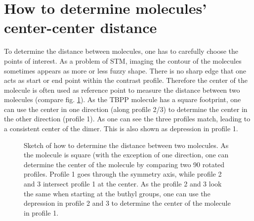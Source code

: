 \label{appendix:TBP}
\section{How to determine molecules' center-center distance}
To determine the distance between molecules, one has to carefully choose the points of interest. As a problem of STM, imaging the contour of the molecules sometimes appears as more or less fuzzy shape. There is no sharp edge that one acts as start or end point within the contrast profile. Therefore the center of the molecule is often used as reference point to measure the distance between two molecules (compare fig. \ref{fig:distance-molecules}). As the TBPP molecule has a square footprint, one can use the center in one direction (along profile 2/3) to determine the center in the other direction (profile 1). As one can see the three profiles match, leading to a consistent center of the dimer. This is also shown as depression in profile 1. 

\begin{figure}[h!]
	\centering
	 \quad
	\caption{Sketch of how to determine the distance between two molecules. As the molecule is square (with the exception of one direction, one can determine the center of the molecule by comparing two \SI{90}{\deg} rotated profiles. Profile 1 goes through the symmetry axis, while profile 2 and 3 intersect profile 1 at the center. As the profile 2 and 3 look the same when starting at the buthyl groups, one can use the depression in profile 2 and 3 to determine the center of the molecule in profile 1.}
	\label{fig:distance-molecules}
\end{figure}
